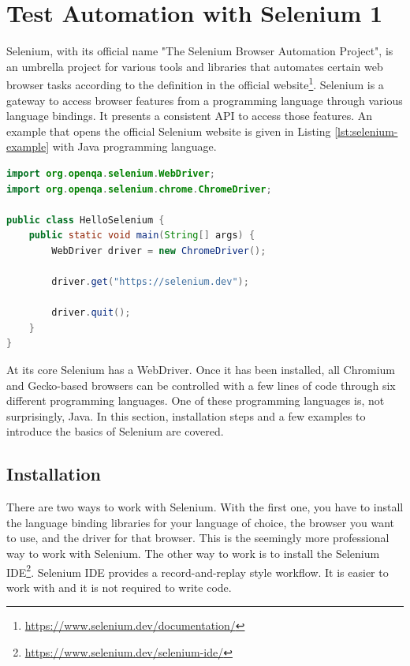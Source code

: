 \chapter{Test Automation with Selenium 1}
Selenium, with its official name "The Selenium Browser Automation Project", is an umbrella project for various tools and libraries that automates certain web browser tasks according to the definition in the official website\footnote{\url{https://www.selenium.dev/documentation/}}. Selenium is a gateway to access browser features from a programming language through various language bindings. It presents a consistent API to access those features. An example that opens the official Selenium website is given in Listing \ref{lst:selenium-example} with Java programming language.

\begin{lstlisting}[language=java,caption={A Java program that opens the official Selenium website through a Chrome-based browser.}, label=lst:selenium-example]
import org.openqa.selenium.WebDriver;
import org.openqa.selenium.chrome.ChromeDriver;

public class HelloSelenium {
    public static void main(String[] args) {
        WebDriver driver = new ChromeDriver();

        driver.get("https://selenium.dev");

        driver.quit();
    }
}
\end{lstlisting}

At its core Selenium has a WebDriver. Once it has been installed, all Chromium and Gecko-based browsers can be controlled with a few lines of code through six different programming languages. One of these programming languages is, not surprisingly, Java. In this section, installation steps and a few examples to introduce the basics of Selenium are covered.

\section{Installation}
There are two ways to work with Selenium. With the first one, you have to install the language binding libraries for your language of choice, the browser you want to use, and the driver for that browser. This is the seemingly more professional way to work with Selenium. The other way to work is to install the Selenium IDE\footnote{\url{https://www.selenium.dev/selenium-ide/}}. Selenium IDE provides a record-and-replay style workflow. It is easier to work with and it is not required to write code.

